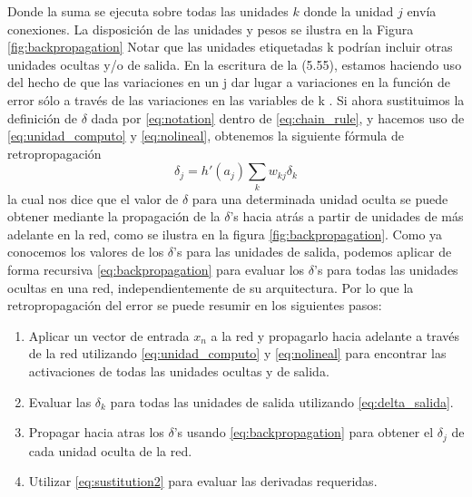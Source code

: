 \documentclass[a4paper,11pt,spanish]{book}
\begin{document}
	Donde la suma se ejecuta sobre todas las unidades $k$ donde la unidad $j$ envía conexiones. La disposición de las unidades y pesos se ilustra en la Figura \ref{fig:backpropagation} 
	Notar que las unidades etiquetadas k podrían incluir otras unidades ocultas y/o de salida. En la escritura de la (5.55), estamos haciendo uso del hecho 
	de que las variaciones en un j dar lugar a variaciones en la función de error sólo a través de las variaciones en las variables de k . Si ahora sustituimos la definición 
	de $\delta$ dada por \eqref{eq:notation} dentro de \eqref{eq:chain_rule}, y hacemos uso de \eqref{eq:unidad_computo} y \eqref{eq:nolineal}, obtenemos la siguiente fórmula de retropropagación
	\begin{equation}\label{eq:backpropagation}
	  \delta_j = h'(a_j) \sum_k w_{kj} \delta_k
	\end{equation}
	la cual nos dice que el valor de $\delta$ para una determinada unidad oculta se puede obtener mediante la propagación de la $\delta$'s hacia atrás a partir de unidades 
	de más adelante en la red, como se ilustra en la figura \ref{fig:backpropagation}.  
	Como ya conocemos los valores de los $\delta$'s para las unidades de salida, podemos aplicar de forma recursiva \eqref{eq:backpropagation} para evaluar los $\delta$'s 
	para todas las unidades ocultas en una red, independientemente de su arquitectura.
	Por lo que la retropropagación del error se puede resumir en los siguientes pasos:
	\begin{enumerate}
	  \item Aplicar un vector de entrada $x_n$ a la red y  propagarlo hacia adelante a través de la red utilizando \eqref{eq:unidad_computo} y \eqref{eq:nolineal} para encontrar 
	  las activaciones de todas las unidades ocultas y de salida.
	  \item Evaluar las $\delta_k$ para todas las unidades de salida utilizando \eqref{eq:delta_salida}.
	  \item Propagar hacia atras los $\delta$'s usando \eqref{eq:backpropagation} para obtener el $\delta_j$ de cada unidad oculta de la red.
	  \item Utilizar \eqref{eq:sustitution2} para evaluar las derivadas requeridas.
	\end{enumerate}
\end{document}

